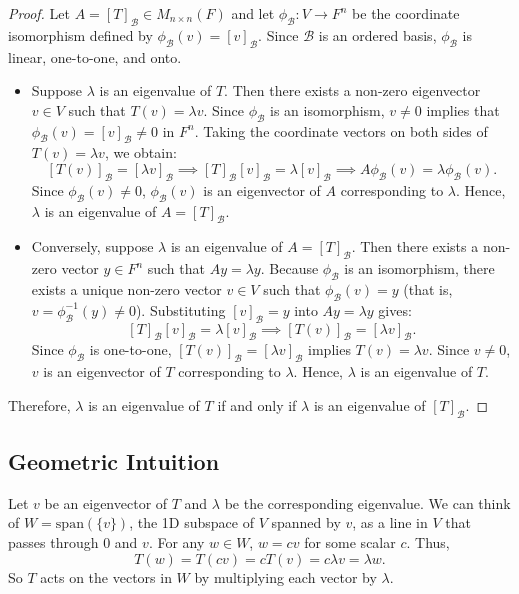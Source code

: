\documentclass[12pt, a4paper]{article}
\theoremstyle{definition}
\theoremstyle{remark}
\newcommand{\B}{\mathscr{B}}
\begin{document}
\begin{proof}
Let $A = [T]_\B \in M_{n \times n}(F)$ and let $\phi_\B : V \to F^n$ be the coordinate isomorphism defined by $\phi_\B(v) = [v]_\B$. Since $\B$ is an ordered basis, $\phi_\B$ is linear, one-to-one, and onto.

\begin{itemize}
    \item[$(\implies)$] Suppose $\lambda$ is an eigenvalue of $T$. Then there exists a non-zero eigenvector $v \in V$ such that $T(v) = \lambda v$. Since $\phi_\B$ is an isomorphism, $v \neq 0$ implies that $\phi_\B(v) = [v]_\B \neq 0$ in $F^n$. Taking the coordinate vectors on both sides of $T(v) = \lambda v$, we obtain:
    \[
    [T(v)]_\B = [\lambda v]_\B \implies [T]_\B [v]_\B = \lambda [v]_\B \implies A \phi_\B(v) = \lambda \phi_\B(v).
    \]
    Since $\phi_\B(v) \neq 0$, $\phi_\B(v)$ is an eigenvector of $A$ corresponding to $\lambda$. Hence, $\lambda$ is an eigenvalue of $A = [T]_\B$.

    \item[$(\impliedby)$] Conversely, suppose $\lambda$ is an eigenvalue of $A = [T]_\B$. Then there exists a non-zero vector $y \in F^n$ such that $A y = \lambda y$. Because $\phi_\B$ is an isomorphism, there exists a unique non-zero vector $v \in V$ such that $\phi_\B(v) = y$ (that is, $v = \phi_\B^{-1}(y) \neq 0$). Substituting $[v]_\B = y$ into $A y = \lambda y$ gives:
    \[
    [T]_\B [v]_\B = \lambda [v]_\B \implies [T(v)]_\B = [\lambda v]_\B.
    \]
    Since $\phi_\B$ is one-to-one, $[T(v)]_\B = [\lambda v]_\B$ implies $T(v) = \lambda v$. Since $v \neq 0$, $v$ is an eigenvector of $T$ corresponding to $\lambda$. Hence, $\lambda$ is an eigenvalue of $T$.
\end{itemize}

Therefore, $\lambda$ is an eigenvalue of $T$ if and only if $\lambda$ is an eigenvalue of $[T]_\B$.
\end{proof}

\subsection*{Geometric Intuition}
Let $v$ be an eigenvector of $T$ and $\lambda$ be the corresponding eigenvalue. We can think of $W = \text{span}(\{v\})$, the 1D subspace of $V$ spanned by $v$, as a line in $V$ that passes through $0$ and $v$. For any $w \in W$, $w = c v$ for some scalar $c$. Thus,
\[
T(w) = T(c v) = c T(v) = c \lambda v = \lambda w.
\]
So $T$ acts on the vectors in $W$ by multiplying each vector by $\lambda$.
\end{document}
